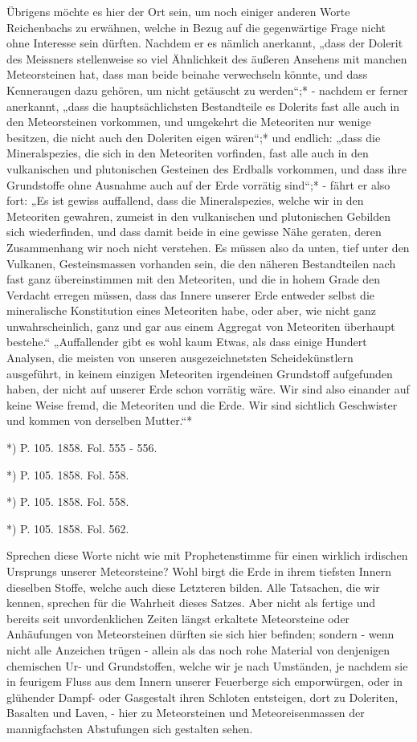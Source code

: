 \documentclass[a4paper, 8pt, oneside, polutonikogreek, german]{article}
\begin{document}
Übrigens möchte es hier der Ort sein, um noch einiger anderen Worte Reichenbachs zu erwähnen, welche in Bezug auf die gegenwärtige Frage nicht ohne Interesse sein dürften. Nachdem er es nämlich anerkannt, „dass der Dolerit des Meissners stellenweise so viel Ähnlichkeit des äußeren Ansehens mit manchen Meteorsteinen hat, dass man beide beinahe verwechseln könnte, und dass Kenneraugen dazu gehören, um nicht getäuscht zu werden“;* - nachdem er ferner anerkannt, „dass die hauptsächlichsten Bestandteile es Dolerits fast alle auch in den Meteorsteinen vorkommen, und umgekehrt die Meteoriten nur wenige besitzen, die nicht auch den Doleriten eigen wären“;* und endlich: „dass die Mineralspezies, die sich in den Meteoriten vorfinden, fast alle auch in den vulkanischen und plutonischen Gesteinen des Erdballs vorkommen, und dass ihre Grundstoffe ohne Ausnahme auch auf der Erde vorrätig sind“;* - fährt er also fort: „Es ist gewiss auffallend, dass die Mineralspezies, welche wir in den Meteoriten gewahren, zumeist in den vulkanischen und plutonischen Gebilden sich wiederfinden, und dass damit beide in eine gewisse Nähe geraten, deren Zusammenhang wir noch nicht verstehen. Es müssen also da unten, tief unter den Vulkanen, Gesteinsmassen vorhanden sein, die den näheren Bestandteilen nach fast ganz übereinstimmen mit den Meteoriten, und die in hohem Grade den Verdacht erregen müssen, dass das Innere unserer Erde entweder selbst die mineralische Konstitution eines Meteoriten habe, oder aber, wie nicht ganz unwahrscheinlich, ganz und gar aus einem Aggregat von Meteoriten überhaupt bestehe.“ „Auffallender gibt es wohl kaum Etwas, als dass einige Hundert Analysen, die meisten von unseren ausgezeichnetsten Scheidekünstlern ausgeführt, in keinem einzigen Meteoriten irgendeinen Grundstoff aufgefunden haben, der nicht auf unserer Erde schon vorrätig wäre. Wir sind also einander auf keine Weise fremd, die Meteoriten und die Erde. Wir sind sichtlich Geschwister und kommen von derselben Mutter.“*

*) P. 105. 1858. Fol. 555 - 556.

*) P. 105. 1858. Fol. 558.

*) P. 105. 1858. Fol. 558.

*) P. 105. 1858. Fol. 562.

Sprechen diese Worte nicht wie mit Prophetenstimme für einen wirklich irdischen Ursprungs unserer Meteorsteine? Wohl birgt die Erde in ihrem tiefsten Innern dieselben Stoffe, welche auch diese Letzteren bilden. Alle Tatsachen, die wir kennen, sprechen für die Wahrheit dieses Satzes. Aber nicht als fertige und bereits seit unvordenklichen Zeiten längst erkaltete Meteorsteine oder Anhäufungen von Meteorsteinen dürften sie sich hier befinden; sondern - wenn nicht alle Anzeichen trügen - allein als das noch rohe Material von denjenigen chemischen Ur- und Grundstoffen, welche wir je nach Umständen, je nachdem sie in feurigem Fluss aus dem Innern unserer Feuerberge sich emporwürgen, oder in glühender Dampf- oder Gasgestalt ihren Schloten entsteigen, dort zu Doleriten, Basalten und Laven, - hier zu Meteorsteinen und Meteoreisenmassen der mannigfachsten Abstufungen sich gestalten sehen.
\end{document}
